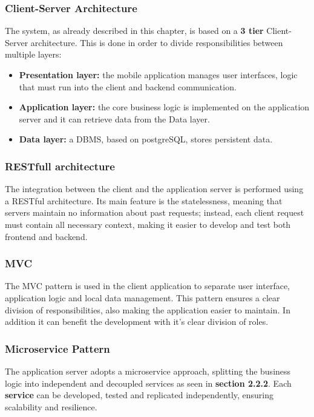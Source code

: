 \documentclass{Configuration_Files/PoliMi3i_thesis}
\begin{document}
\subsubsection{Client-Server Architecture}
The system, as already described in this chapter, is based on a \textbf{3 tier} Client-Server architecture.
This is done in order to divide responsibilities between multiple layers:
\begin{itemize}
    \item \textbf{Presentation layer:} the mobile application manages user interfaces, logic that must run into the client and backend communication.
    \item \textbf{Application layer:} the core business logic is implemented on the application server and it can retrieve data from the Data layer. 
    \item \textbf{Data layer:} a DBMS, based on postgreSQL, stores persistent data.
\end{itemize}

\subsubsection{RESTfull architecture}
The integration between the client and the application server is performed using a RESTful architecture.
Its main feature is the statelessness, meaning that servers maintain no information about past requests; instead, each client request must contain all necessary context, making it easier to develop and test both frontend and backend.

\subsubsection{MVC}
The MVC pattern is used in the client application to separate user interface, application logic and local data management. 
This pattern ensures a clear division of responsibilities, also making the application easier to maintain. In addition it can benefit the development with it's clear division of roles.

\subsubsection{Microservice Pattern}
The application server adopts a microservice approach, splitting the business logic into independent and decoupled services as seen in \textbf{section 2.2.2}.
Each \textbf{service} can be developed, tested and replicated independently, ensuring scalability and resilience.
\end{document}
